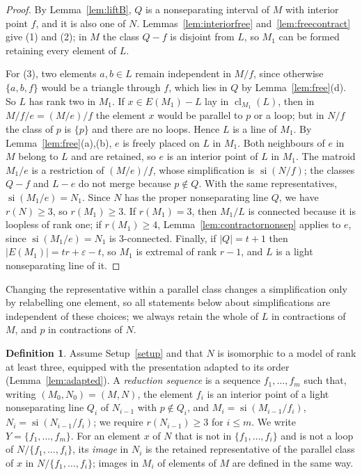 \documentclass[11pt]{amsart}
\theoremstyle{definition}
\newtheorem{definition}[theorem]{Definition}
\theoremstyle{remark}
\numberwithin{equation}{section}
\newcommand{\cl}{\operatorname{cl}}
\newcommand{\si}{\operatorname{si}}
\begin{document}
\begin{proof}
By Lemma~\ref{lem:liftB}, $Q$ is a nonseparating interval of $M$ with interior point $f$, and it is also one of $N$. Lemmas~\ref{lem:interiorfree} and~\ref{lem:freecontract} give (1) and (2); in $M$ the class $Q-f$ is disjoint from $L$, so $M_1$ can be formed retaining every element of $L$.

For (3), two elements $a,b\in L$ remain independent in $M/f$, since otherwise $\{a,b,f\}$ would be a triangle through $f$, which lies in $Q$ by Lemma~\ref{lem:free}(d). So $L$ has rank two in $M_1$. If $x\in E(M_1)-L$ lay in $\cl_{M_1}(L)$, then in $M/f/e=(M/e)/f$ the element $x$ would be parallel to $p$ or a loop; but in $N/f$ the class of $p$ is $\{p\}$ and there are no loops. Hence $L$ is a line of $M_1$. By Lemma~\ref{lem:free}(a),(b), $e$ is freely placed on $L$ in $M_1$. Both neighbours of $e$ in $M$ belong to $L$ and are retained, so $e$ is an interior point of $L$ in $M_1$. The matroid $M_1/e$ is a restriction of $(M/e)/f$, whose simplification is $\si(N/f)$; the classes $Q-f$ and $L-e$ do not merge because $p\notin Q$. With the same representatives, $\si(M_1/e)=N_1$. Since $N$ has the proper nonseparating line $Q$, we have $r(N)\ge3$, so $r(M_1)\ge3$. If $r(M_1)=3$, then $M_1/L$ is connected because it is loopless of rank one; if $r(M_1)\ge4$, Lemma~\ref{lem:contractornonsep} applies to $e$, since $\si(M_1/e)=N_1$ is $3$-connected. Finally, if $|Q|=t+1$ then $|E(M_1)|=tr+\varepsilon-t$, so $M_1$ is extremal of rank $r-1$, and $L$ is a light nonseparating line of it.
\end{proof}

Changing the representative within a parallel class changes a simplification only by relabelling one element, so all statements below about simplifications are independent of these choices; we always retain the whole of $L$ in contractions of $M$, and $p$ in contractions of $N$.

\begin{definition}\label{def:reduction}
Assume Setup~\ref{setup} and that $N$ is isomorphic to a model of rank at least three, equipped with the presentation adapted to its order (Lemma~\ref{lem:adapted}). A \emph{reduction sequence} is a sequence $f_1,\dots,f_m$ such that, writing $(M_0,N_0)=(M,N)$, the element $f_i$ is an interior point of a light nonseparating line $Q_i$ of $N_{i-1}$ with $p\notin Q_i$, and $M_i=\si(M_{i-1}/f_i)$, $N_i=\si(N_{i-1}/f_i)$; we require $r(N_{i-1})\ge3$ for $i\le m$. We write $Y=\{f_1,\dots,f_m\}$. For an element $x$ of $N$ that is not in $\{f_1,\dots,f_i\}$ and is not a loop of $N/\{f_1,\dots,f_i\}$, its \emph{image} in $N_i$ is the retained representative of the parallel class of $x$ in $N/\{f_1,\dots,f_i\}$; images in $M_i$ of elements of $M$ are defined in the same way.
\end{definition}
\end{document}
